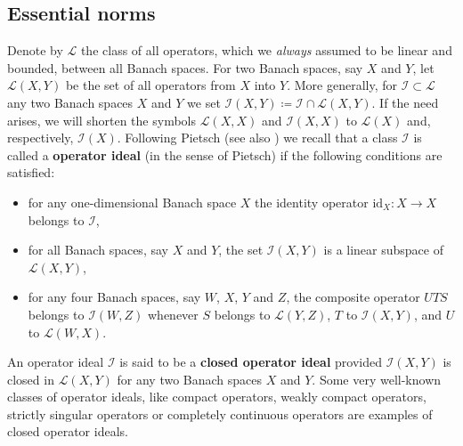 \documentclass[11pt]{amsart}
\theoremstyle{definition}
\theoremstyle{definition}
\theoremstyle{definition}
\theoremstyle{definition}
\theoremstyle{definition}
\theoremstyle{definition}
\theoremstyle{definition}
\theoremstyle{definition}
\numberwithin{equation}{section}
\numberwithin{equation}{section}
\numberwithin{equation}{section}
\theoremstyle{definition}
\theoremstyle{definition}
\theoremstyle{definition}
\theoremstyle{definition}
\theoremstyle{definition}
\theoremstyle{definition}
\begin{document}
\subsection{Essential norms}
Denote by $\mathscr{L}$ the class of all operators, which we {\it always} assumed to be linear and bounded, between all Banach spaces.
For two Banach spaces, say $X$ and $Y$, let $\mathscr{L}(X,Y)$ be the set of all operators from $X$ into $Y$. More generally, for
$\mathscr{I} \subset \mathscr{L}$ any two Banach spaces $X$ and $Y$ we set $\mathscr{I}(X,Y) \coloneqq \mathscr{I} \cap \mathscr{L}(X,Y)$.
If the need arises, we will shorten the symbols $\mathscr{L}(X,X)$ and $\mathscr{I}(X,X)$ to $\mathscr{L}(X)$ and, respectively, $\mathscr{I}(X)$.
Following Pietsch \cite{Pie80} (see also \cite{DJP01}) we recall that a class $\mathscr{I}$ is called a {\bf operator ideal} (in the sense of Pietsch)
if the following conditions are satisfied:
\begin{itemize}
	\item[$\bullet$] for any one-dimensional Banach space $X$ the identity operator $\text{id}_X \colon X \rightarrow X$ belongs to $\mathscr{I}$,
	\item[$\bullet$] for all Banach spaces, say $X$ and $Y$, the set $\mathscr{I}(X,Y)$ is a linear subspace of $\mathscr{L}(X,Y)$,
	\item[$\bullet$] for any four Banach spaces, say $W$, $X$, $Y$ and $Z$, the composite operator $UTS$ belongs to $\mathscr{I}(W,Z)$
	whenever $S$ belongs to $\mathscr{L}(Y,Z)$, $T$ to $\mathscr{I}(X,Y)$, and $U$ to $\mathscr{L}(W,X)$.
\end{itemize}
An operator ideal $\mathscr{I}$ is said to be a {\bf closed operator ideal} provided $\mathscr{I}(X,Y)$ is closed in $\mathscr{L}(X,Y)$ for any two Banach
spaces $X$ and $Y$. Some very well-known classes of operator ideals, like compact operators, weakly compact operators, strictly singular operators
or completely continuous operators are examples of closed operator ideals.
\end{document}
